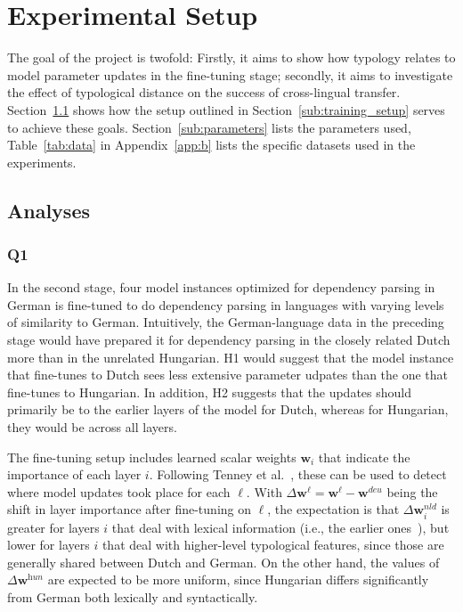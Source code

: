 
\section{Experimental Setup}
The goal of the project is twofold: Firstly, it aims to show how typology relates to model parameter updates in the fine-tuning stage; secondly, it aims to investigate the effect of typological distance on the success of cross-lingual transfer. Section~\ref{sub:analyses} shows how the setup outlined in Section~\ref{sub:training_setup} serves to achieve these goals. Section~\ref{sub:parameters} lists the parameters used, Table~\ref{tab:data} in Appendix~\ref{app:b} lists the specific datasets used in the experiments.

	\subsection{Analyses}
	\label{sub:analyses}
		\subsubsection{Q1}
		In the second stage, four model instances optimized for dependency parsing in German is fine-tuned to do dependency parsing in languages with varying levels of similarity to German. Intuitively, the German-language data in the preceding stage would have prepared it for dependency parsing in the closely related Dutch more than in the unrelated Hungarian. H1 would suggest that the model instance that fine-tunes to Dutch sees less extensive parameter udpates than the one that fine-tunes to Hungarian. In addition, H2 suggests that the updates should primarily be to the earlier layers of the model for Dutch, whereas for Hungarian, they would be across all layers.

		The fine-tuning setup includes learned scalar weights $\mathbf{w}_i$ that indicate the importance of each layer $i$. Following Tenney et al.~\cite{tenney-etal-2019-bert}, these can be used to detect where model updates took place for each $\ell$. With $\Delta\mathbf{w}^\ell = \mathbf{w}^\ell - \mathbf{w}^{\textit{deu}}$ being the shift in layer importance after fine-tuning on $\ell$, the expectation is that $\Delta\mathbf{w}^{\textit{nld}}_i$ is greater for layers $i$ that deal with lexical information (i.e., the earlier ones~\cite{tenney-etal-2019-bert}), but lower for layers $i$ that deal with higher-level typological features, since those are generally shared between Dutch and German. On the other hand, the values of $\Delta\mathbf{w}^{\textit{hun}}$ are expected to be more uniform, since Hungarian differs significantly from German both lexically and syntactically.

